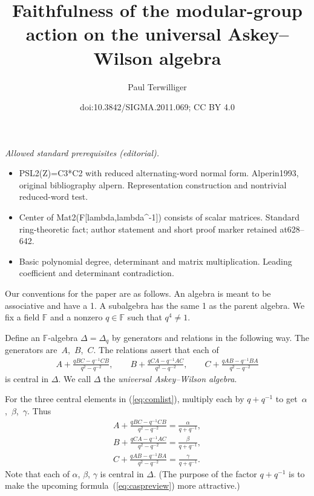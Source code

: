 \documentclass[10pt,a4paper]{amsart}
\title{Faithfulness of the modular-group action on the universal Askey–Wilson algebra}
\author{Paul Terwilliger}
\date{doi:10.3842/SIGMA.2011.069; CC BY 4.0}
\numberwithin{equation}{section}
\begin{document}
\maketitle
\noindent\textit{Allowed standard prerequisites (editorial).}\begin{itemize}
\item PSL2(Z)=C3*C2 with reduced alternating-word normal form. Alperin1993, original bibliography alpern. Representation construction and nontrivial reduced-word test.
\item Center of Mat2(F[lambda,lambda\textasciicircum{}-1]) consists of scalar matrices. Standard ring-theoretic fact; author statement and short proof marker retained at628–642.
\item Basic polynomial degree, determinant and matrix multiplication. Leading coefficient and determinant contradiction.
\end{itemize}\medskip
Our conventions for the paper are as follows.
An algebra is meant to be associative and have a 1.
A subalgebra has the same 1 as the parent algebra.
We f\/ix a f\/ield $\mathbb F$
and  a nonzero $q \in \mathbb F$ such that $q^4\not=1$.

\begin{Definition}
\label{def:uaw}
Def\/ine an $\mathbb F$-algebra
$\Delta=\Delta_q$
 by generators and relations in the following way.
The generators are~$A$,~$B$,~$C$.
The relations assert that each of
\begin{gather}
 A+ \frac{qBC-q^{-1}CB}{q^2-q^{-2}},
\qquad B+
\frac{qCA-q^{-1}AC}{q^2-q^{-2}},
\qquad
C+
\frac{qAB-q^{-1}BA}{q^2-q^{-2}}
\label{eq:comlist}
\end{gather}
is central in $\Delta$.
We call $\Delta$ the {\it universal Askey--Wilson algebra}.
\end{Definition}





\begin{Definition}
\label{def:abc}
\rm
For the
three central elements in
(\ref{eq:comlist}), multiply each by $q+q^{-1}$ to get~$\alpha$,~$\beta$,~$\gamma$. Thus
\begin{gather}
A+ \frac{qBC-q^{-1}CB}{q^2-q^{-2}}
=
\frac{\alpha}{q+q^{-1}},
\label{eq:u1}
\\
B+
\frac{qCA-q^{-1}AC}{q^2-q^{-2}}
=
\frac{\beta}{q+q^{-1}},
\label{eq:u2}
\\
C+
\frac{qAB-q^{-1}BA}{q^2-q^{-2}}
=
\frac{\gamma}{q+q^{-1}}.
\label{eq:u3}
\end{gather}
Note that each of $\alpha$, $\beta$, $\gamma$ is central in
$\Delta$.
(The purpose of the factor $q+q^{-1}$ is
to make the upcoming formula~(\ref{eq:caspreview})
more attractive.)
\end{Definition}
\end{document}
